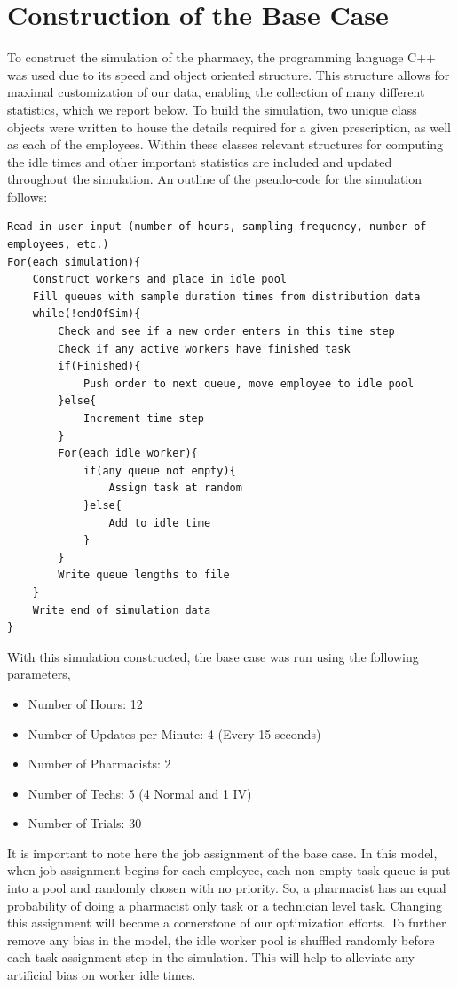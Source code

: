 \documentclass[10pt]{report}            %
\begin{document}
\section*{Construction of the Base Case}
To construct the simulation of the pharmacy, the programming language C++ was used due to its speed and object oriented structure. This structure allows for maximal customization of our data, enabling the collection of many different statistics, which we report below. To build the simulation, two unique class objects were written to house the details required for a given prescription, as well as each of the employees. Within these classes relevant structures for computing the idle times and other important statistics are included and updated throughout the simulation. An outline of the pseudo-code for the simulation follows:
\begin{verbatim}
Read in user input (number of hours, sampling frequency, number of employees, etc.)
For(each simulation){
    Construct workers and place in idle pool
    Fill queues with sample duration times from distribution data
    while(!endOfSim){
        Check and see if a new order enters in this time step
        Check if any active workers have finished task
        if(Finished){
            Push order to next queue, move employee to idle pool
        }else{
            Increment time step
        }
        For(each idle worker){
            if(any queue not empty){
                Assign task at random                   
            }else{
                Add to idle time
            }
        }
        Write queue lengths to file
    }
    Write end of simulation data
}
\end{verbatim}
With this simulation constructed, the base case was run using the following parameters,
\begin{itemize}
\item Number of Hours: 12
\item Number of Updates per Minute: 4 (Every 15 seconds)
\item Number of Pharmacists: 2
\item Number of Techs: 5 (4 Normal and 1 IV)
\item Number of Trials: 30
\end{itemize}
It is important to note here the job assignment of the base case. In this model, when job assignment begins for each employee, each non-empty task queue is put into a pool and randomly chosen with no priority. So, a pharmacist has an equal probability of doing a pharmacist only task or a technician level task. Changing this assignment will become a cornerstone of our optimization efforts. To further remove any bias in the model, the idle worker pool is shuffled randomly before each task assignment step in the simulation. This will help to alleviate any artificial bias on worker idle times.
\end{document}
